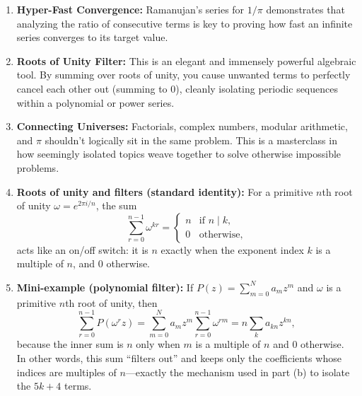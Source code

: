 \begin{takeaways}
\begin{enumerate}
    \item \textbf{Hyper-Fast Convergence:} Ramanujan's series for $1/\pi$ demonstrates that analyzing the ratio of consecutive terms is key to proving how fast an infinite series converges to its target value.
    \item \textbf{Roots of Unity Filter:} This is an elegant and immensely powerful algebraic tool. By summing over roots of unity, you cause unwanted terms to perfectly cancel each other out (summing to 0), cleanly isolating periodic sequences within a polynomial or power series.
    \item \textbf{Connecting Universes:} Factorials, complex numbers, modular arithmetic, and $\pi$ shouldn't logically sit in the same problem. This is a masterclass in how seemingly isolated topics weave together to solve otherwise impossible problems.
    \item \textbf{Roots of unity and filters (standard identity):} For a primitive $n$th root of unity $\omega = e^{2\pi i/n}$, the sum
    \[
      \sum_{r=0}^{n-1} \omega^{kr} =
      \begin{cases}
        n & \text{if } n \mid k,\\
        0 & \text{otherwise,}
      \end{cases}
    \]
    acts like an on/off switch: it is $n$ exactly when the exponent index $k$ is a multiple of $n$, and $0$ otherwise.
    \item \textbf{Mini-example (polynomial filter):} If $P(z) = \sum_{m=0}^{N} a_m z^m$ and $\omega$ is a primitive $n$th root of unity, then
    \[
      \sum_{r=0}^{n-1} P(\omega^r z)
      = \sum_{m=0}^{N} a_m z^m \sum_{r=0}^{n-1} \omega^{rm}
      = n \sum_{k} a_{kn} z^{kn},
    \]
    because the inner sum is $n$ only when $m$ is a multiple of $n$ and $0$ otherwise. In other words, this sum ``filters out'' and keeps only the coefficients whose indices are multiples of $n$—exactly the mechanism used in part (b) to isolate the $5k+4$ terms.
\end{enumerate}
\end{takeaways}
